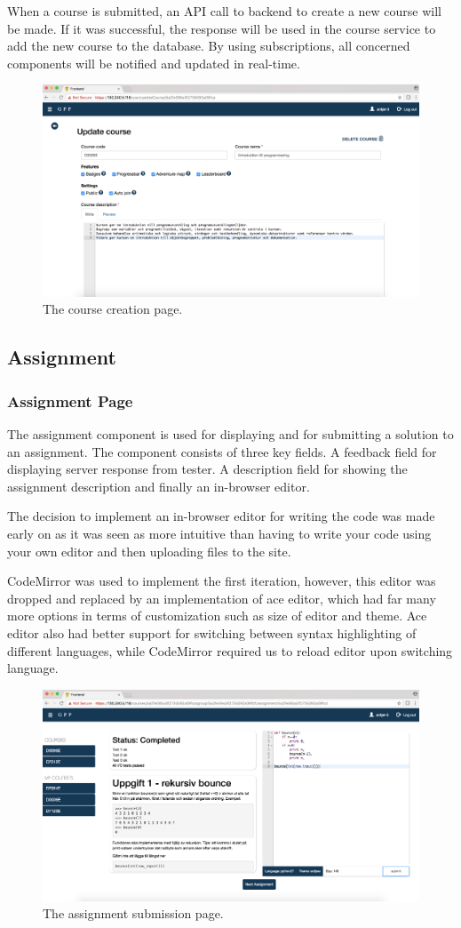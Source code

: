When a course is submitted, an API call to backend to create a new course will be made. If it was successful, the response will be used in the course service to add the new course to the database. By using subscriptions, all concerned components will be notified and updated in real-time.
\begin{figure}[H]
    \centering
    \includegraphics[width=.5\textwidth]{img/gppinpictures/editcourse.png}
    \caption{The course creation page.}
\end{figure}

\subsection{Assignment}
\subsubsection{Assignment Page}
The assignment component is used for displaying and for submitting a solution to an assignment. The component consists of three key fields. A feedback field for displaying server response from tester. A description field for showing the assignment description and finally an in-browser editor. 

The decision to implement an in-browser editor for writing the code was made early on as it was seen as more intuitive than having to write your code using your own editor and then uploading files to the site.

CodeMirror was used to implement the first iteration, however, this editor was dropped and replaced by an implementation of ace editor, which had far many more options in terms of customization such as size of editor and theme. Ace editor also had better support for switching between syntax highlighting of different languages, while CodeMirror required us to reload editor upon switching language. 
\begin{figure}[H]
    \centering
    \includegraphics[width=.5\textwidth]{img/gppinpictures/assignment.png}
    \caption{The assignment submission page.}
\end{figure}

